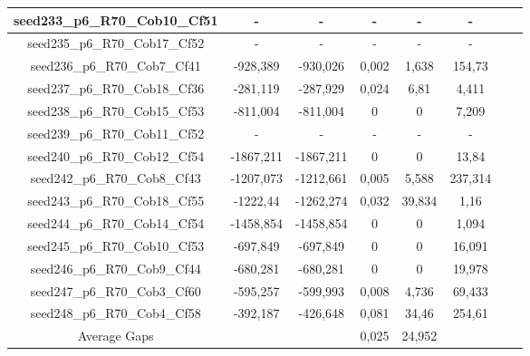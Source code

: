 \documentclass[a4paper]{article}
\begin{document}
\begin{center}
\begin{longtable}{cccccccc}
\hline
seed233\_p6\_R70\_Cob10\_Cf51 & - & - & - & - & -\\
\hline
seed235\_p6\_R70\_Cob17\_Cf52 & - & - & - & - & -\\
\hline
seed236\_p6\_R70\_Cob7\_Cf41 & -928,389 & -930,026 & 0,002 & 1,638 & 154,73\\
\hline
seed237\_p6\_R70\_Cob18\_Cf36 & -281,119 & -287,929 & 0,024 & 6,81 & 4,411\\
\hline
seed238\_p6\_R70\_Cob15\_Cf53 & -811,004 & -811,004 & 0 & 0 & 7,209\\
\hline
seed239\_p6\_R70\_Cob11\_Cf52 & - & - & - & - & -\\
\hline
seed240\_p6\_R70\_Cob12\_Cf54 & -1867,211 & -1867,211 & 0 & 0 & 13,84\\
\hline
seed242\_p6\_R70\_Cob8\_Cf43 & -1207,073 & -1212,661 & 0,005 & 5,588 & 237,314\\
\hline
seed243\_p6\_R70\_Cob18\_Cf55 & -1222,44 & -1262,274 & 0,032 & 39,834 & 1,16\\
\hline
seed244\_p6\_R70\_Cob14\_Cf54 & -1458,854 & -1458,854 & 0 & 0 & 1,094\\
\hline
seed245\_p6\_R70\_Cob10\_Cf53 & -697,849 & -697,849 & 0 & 0 & 16,091\\
\hline
seed246\_p6\_R70\_Cob9\_Cf44 & -680,281 & -680,281 & 0 & 0 & 19,978\\
\hline
seed247\_p6\_R70\_Cob3\_Cf60 & -595,257 & -599,993 & 0,008 & 4,736 & 69,433\\
\hline
seed248\_p6\_R70\_Cob4\_Cf58 & -392,187 & -426,648 & 0,081 & 34,46 & 254,61\\
\hline
\hline
Average Gaps & & & 0,025 & 24,952 &  \\
\hline
\hline
\end{longtable}
\end{center}
\end{document}
